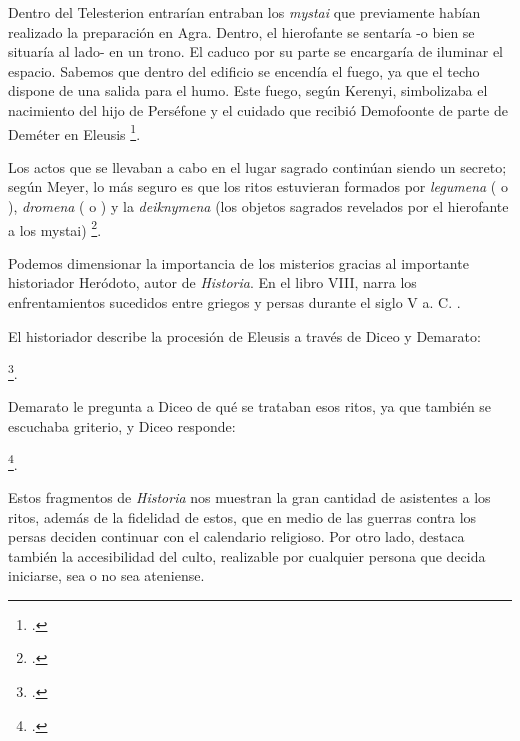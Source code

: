 Dentro del Telesterion entrarían entraban los \textit{mystai} que previamente habían realizado la preparación en Agra. Dentro, el hierofante se sentaría -o bien se situaría al lado- en un trono. El caduco por su parte se encargaría de iluminar el espacio. Sabemos que dentro del edificio se encendía el fuego, ya que el techo dispone de una salida para el humo. Este fuego, según Kerenyi, simbolizaba el nacimiento del hijo de Perséfone y el cuidado que recibió Demofoonte de parte de Deméter en Eleusis \footcite[113]{kerenyiEleusisImagenArquetipica2004}.

Los actos que se llevaban a cabo en el lugar sagrado continúan siendo un secreto; según Meyer, lo más seguro es que los ritos estuvieran formados por \textit{legumena} ( o ), \textit{dromena} ( o ) y la \textit{deiknymena} (los objetos sagrados revelados por el hierofante a los mystai) \footcite[11]{w.meyerAncientMysteriesSource1986}. 

Podemos dimensionar la importancia de los misterios gracias al importante historiador Heródoto, autor de \textit{Historia}. En el libro VIII, narra los enfrentamientos sucedidos entre griegos y persas durante el siglo V a. C. . 

El historiador describe la procesión de Eleusis a través de Diceo y Demarato:

\footcite[105-106]{herodotoHistoria1989}.

Demarato le pregunta a Diceo de qué se trataban esos ritos, ya que también se escuchaba griterio, y Diceo responde:

\footcite [107]{herodotoHistoria1989}.

Estos fragmentos de \textit{Historia} nos muestran la gran cantidad de asistentes a los ritos, además de la fidelidad de estos, que en medio de las guerras contra los persas deciden continuar con el calendario religioso. Por otro lado, destaca también la accesibilidad del culto, realizable por cualquier persona que decida iniciarse, sea o no sea ateniense.

